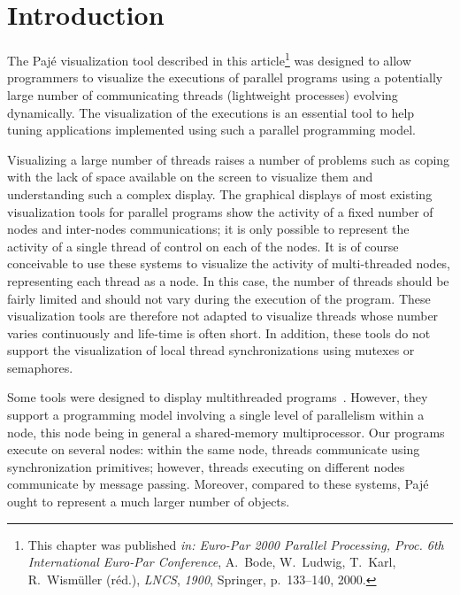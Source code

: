 
\section{Introduction}

The Pajé visualization tool described in this article\footnote{This
  chapter was published \emph{in: Euro-Par 2000 Parallel Processing,
    Proc. 6th International Euro-Par Conference}, A.~Bode, W.~Ludwig,
  T.~Karl, R.~Wism\"uller (r\'ed.), \emph{LNCS}, \emph{1900},
  Springer, p.~133--140, 2000.} was designed to allow programmers to
visualize the executions of parallel programs using a potentially
large number of communicating threads (lightweight processes) evolving
dynamically.  The visualization of the executions is an essential tool
to help tuning applications implemented using such a parallel
programming model.

Visualizing a large number of threads raises a number of problems such
as coping with the lack of space available on the screen to visualize
them and understanding such a complex display. The graphical displays
of most existing visualization tools for parallel programs
\cite{Heath:1991,upshot,Kranzlmueller:1996:PPV,PALLAS,pablo,ncstrl.gatech_cc//GIT-CC-95-21,ute}
show the activity of a fixed number of nodes and inter-nodes
communications; it is only possible to represent the activity of a
single thread of control on each of the nodes. It is of course
conceivable to use these systems to visualize the activity of
multi-threaded nodes, representing each thread as a node.  In this
case, the number of threads should be fairly limited and should not
vary during the execution of the program. These visualization tools
are therefore not adapted to visualize threads whose number varies
continuously and life-time is often short.  In addition, these tools
do not support the visualization of local thread synchronizations
using mutexes or semaphores.

Some tools were designed to display multithreaded
programs~\cite{HammondKev1995a,gthread}.  However, they support a
programming model involving a single level of parallelism within a
node, this node being in general a shared-memory multiprocessor. Our
programs execute on several nodes: within the same node, threads
communicate using synchronization primitives; however, threads
executing on different nodes communicate by message passing. Moreover,
compared to these systems, Pajé ought to represent a much larger
number of objects.

